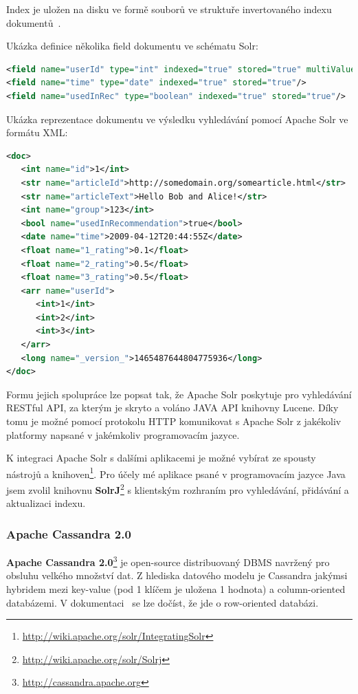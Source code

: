 \documentclass[thesis=M,czech]{FITthesis}[2014/05/07]
\begin{document}
Index je uložen na disku ve formě souborů ve struktuře invertovaného indexu dokumentů~\cite{wiki:invindex}.

Ukázka definice několika field dokumentu ve schématu Solr:

\begin{lstlisting}[language=xml]
<field name="userId" type="int" indexed="true" stored="true" multiValued="true"/>	
<field name="time" type="date" indexed="true" stored="true"/>
<field name="usedInRec" type="boolean" indexed="true" stored="true"/>
\end{lstlisting}

Ukázka reprezentace dokumentu ve výsledku vyhledávání pomocí Apache Solr ve formátu XML:

\begin{lstlisting}[language=xml]
<doc>
   <int name="id">1</int>
   <str name="articleId">http://somedomain.org/somearticle.html</str>
   <str name="articleText">Hello Bob and Alice!</str>
   <int name="group">123</int>
   <bool name="usedInRecommendation">true</bool>
   <date name="time">2009-04-12T20:44:55Z</date>
   <float name="1_rating">0.1</float>
   <float name="2_rating">0.5</float>
   <float name="3_rating">0.5</float>      
   <arr name="userId">
      <int>1</int>
      <int>2</int>
      <int>3</int>
   </arr>
   <long name="_version_">1465487644804775936</long>      
</doc>
\end{lstlisting}

Formu jejich spolupráce lze popsat tak, že Apache Solr poskytuje pro vyhledávání RESTful API, za kterým je skryto a voláno JAVA API knihovny Lucene. Díky tomu je možné pomocí protokolu HTTP komunikovat s Apache Solr z jakékoliv platformy napsané v jakémkoliv programovacím jazyce. 

K integraci Apache Solr s dalšími aplikacemi je možné vybírat ze spousty nástrojů a knihoven\footnote{\url{http://wiki.apache.org/solr/IntegratingSolr}}. Pro účely mé aplikace psané v programovacím jazyce Java jsem zvolil knihovnu \textbf{SolrJ}\footnote{\url{http://wiki.apache.org/solr/Solrj}} s klientským rozhraním pro vyhledávání, přidávání a aktualizaci indexu. 

\subsubsection{Apache Cassandra 2.0}
\textbf{Apache Cassandra 2.0}\footnote{\url{http://cassandra.apache.org}} je open-source distribuovaný DBMS navržený pro obsluhu velkého množství dat. Z hlediska datového modelu je Cassandra jakýmsi hybridem mezi key-value (pod 1 klíčem je uložena 1 hodnota) a column-oriented databázemi. V dokumentaci~\cite{cassdoc} se lze dočíst, že jde o row-oriented databázi.
\end{document}
